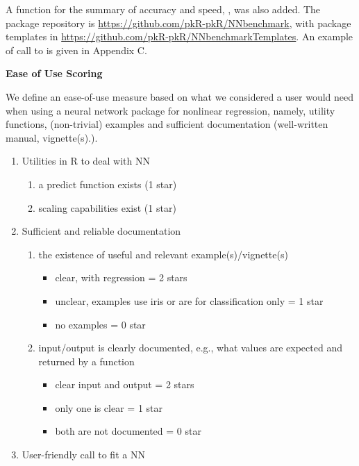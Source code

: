 A function for the summary of accuracy and speed, , was
also added. The package repository is
\url{https://github.com/pkR-pkR/NNbenchmark}, with package templates in
\url{https://github.com/pkR-pkR/NNbenchmarkTemplates}. An example of
call to  is given in Appendix C.

\textbf{Ease of Use Scoring}

We define an ease-of-use measure based on what we considered a user
would need when using a neural network package for nonlinear regression,
namely, utility functions, (non-trivial) examples and sufficient
documentation (well-written manual, vignette(s).).

\begin{enumerate}
\def\labelenumi{\arabic{enumi}.}
\tightlist
\item
  Utilities in R to deal with NN

  \begin{enumerate}
  \def\labelenumii{\alph{enumii}.}
  \tightlist
  \item
    a predict function exists (1 star)
  \item
    scaling capabilities exist (1 star)
  \end{enumerate}
\item
  Sufficient and reliable documentation

  \begin{enumerate}
  \def\labelenumii{\alph{enumii}.}
  \tightlist
  \item
    the existence of useful and relevant example(s)/vignette(s)

    \begin{itemize}
    \tightlist
    \item
      clear, with regression = 2 stars
    \item
      unclear, examples use iris or are for classification only = 1 star
    \item
      no examples = 0 star
    \end{itemize}
  \item
    input/output is clearly documented, e.g., what values are expected
    and returned by a function

    \begin{itemize}
    \tightlist
    \item
      clear input and output = 2 stars
    \item
      only one is clear = 1 star
    \item
      both are not documented = 0 star
    \end{itemize}
  \end{enumerate}
\item
  User-friendly call to fit a NN


\end{enumerate}
